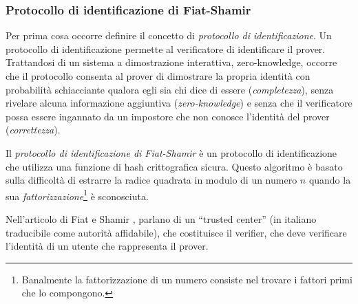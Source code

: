 \documentclass{article}
\theoremstyle{definition}
\begin{document}
\subsubsection{Protocollo di identificazione di Fiat-Shamir}
Per prima cosa occorre definire il concetto di \emph{protocollo di identificazione}. Un protocollo di identificazione permette al verificatore di identificare il prover. 
Trattandosi di un sistema a dimostrazione interattiva, zero-knowledge, occorre che il protocollo consenta al prover di dimostrare la propria identità con probabilità schiacciante qualora egli sia chi dice di essere (\emph{completezza}), senza rivelare alcuna informazione aggiuntiva (\emph{zero-knowledge}) e senza che il verificatore possa essere ingannato da un impostore che non conosce l'identità del prover (\emph{correttezza}).

Il \emph{protocollo di identificazione di Fiat-Shamir} è un protocollo di identificazione che utilizza una funzione di hash crittografica sicura. Questo algoritmo è basato sulla difficoltà di estrarre la radice quadrata in modulo di un numero $n$ quando la sua \emph{fattorizzazione}\footnote{Banalmente la fattorizzazione di un numero consiste nel trovare i fattori primi che lo compongono.} è sconosciuta.

Nell'articolo di Fiat e Shamir \cite{identification}, parlano di un ``trusted center'' (in italiano traducibile come autorità affidabile), che costituisce il verifier, che deve verificare l'identità di un utente che rappresenta il prover.
\end{document}
